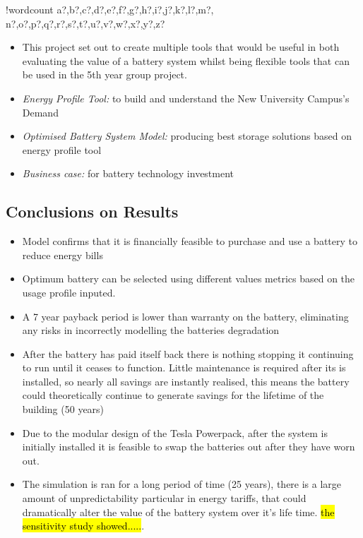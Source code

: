 \documentclass[fontsize=9.5pt]{extarticle}
\numberwithin{figure}{section} %
\providecommand{\tightlist}{%
  \setlength{\itemsep}{0pt}\setlength{\parskip}{0pt}}
\newcounter{words}
\newenvironment{counted}{%
  \setcounter{words}{0}
  \SearchList!{wordcount}{\stepcounter{words}}
    {a?,b?,c?,d?,e?,f?,g?,h?,i?,j?,k?,l?,m?,
    n?,o?,p?,q?,r?,s?,t?,u?,v?,w?,x?,y?,z?}
  \UndoBoundary{'}
  \SearchOrder{p;}}{%
  \StopSearching}
\begin{document}
\begin{counted}
\begin{itemize}
\tightlist
\item
  This project set out to create multiple tools that would be useful in
  both evaluating the value of a battery system whilst being flexible
  tools that can be used in the 5th year group project.
\item
  \emph{Energy Profile Tool:} to build and understand the New University
  Campus's Demand
\item
  \emph{Optimised Battery System Model:} producing best storage
  solutions based on energy profile tool
\item
  \emph{Business case:} for battery technology investment
\end{itemize}

\subsection{Conclusions on Results}\label{conclusions-on-results}

\begin{itemize}
\tightlist
\item
  Model confirms that it is financially feasible to purchase and use a
  battery to reduce energy bills
\item
  Optimum battery can be selected using different values metrics based
  on the usage profile inputed.
\item
  A 7 year payback period is lower than warranty on the battery,
  eliminating any risks in incorrectly modelling the batteries
  degradation
\item
  After the battery has paid itself back there is nothing stopping it
  continuing to run until it ceases to function. Little maintenance is
  required after its is installed, so nearly all savings are instantly
  realised, this means the battery could theoretically continue to
  generate savings for the lifetime of the building (50 years)
\item
  Due to the modular design of the Tesla Powerpack, after the system is
  initially installed it is feasible to swap the batteries out after
  they have worn out.
\item
  The simulation is ran for a long period of time (25 years), there is a
  large amount of unpredictability particular in energy tariffs, that
  could dramatically alter the value of the battery system over it's
  life time. \hl{the sensitivity study showed.....}.
\end{itemize}


\end{counted}
\end{document}
